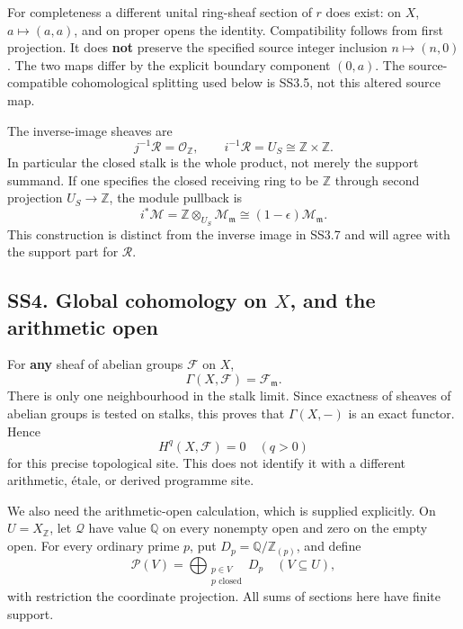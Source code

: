 For completeness a different unital ring-sheaf section of \(r\) does
exist: on \(X\), \(a\mapsto(a,a)\), and on proper opens the identity.
Compatibility follows from first projection. It does \textbf{not}
preserve the specified source integer inclusion \(n\mapsto(n,0)\). The
two maps differ by the explicit boundary component \((0,a)\). The
source-compatible cohomological splitting used below is SS3.5, not this
altered source map.

The inverse-image sheaves are \[
 j^{-1}\mathcal R=\mathcal O_{\mathbb Z},\qquad
 i^{-1}\mathcal R=U_S\cong\mathbb Z\times\mathbb Z.
\tag{SS3.7}
\] In particular the closed stalk is the whole product, not merely the
support summand. If one specifies the closed receiving ring to be
\(\mathbb Z\) through second projection \(U_S\to\mathbb Z\), the module
pullback is \[
 i^*\mathcal M=\mathbb Z\otimes_{U_S}\mathcal M_{\mathfrak m}
 \cong(1-\epsilon)\mathcal M_{\mathfrak m}.
\tag{SS3.8}
\] This construction is distinct from the inverse image in SS3.7 and
will agree with the support part for \(\mathcal R\).

\subsection{\texorpdfstring{SS4. Global cohomology on \(X\), and the
arithmetic
open}{SS4. Global cohomology on X, and the arithmetic open}}\label{ss4.-global-cohomology-on-x-and-the-arithmetic-open}

For \textbf{any} sheaf of abelian groups \(\mathcal F\) on \(X\), \[
 \Gamma(X,\mathcal F)=\mathcal F_{\mathfrak m}.
\tag{SS4.1}
\] There is only one neighbourhood in the stalk limit. Since exactness
of sheaves of abelian groups is tested on stalks, this proves that
\(\Gamma(X,-)\) is an exact functor. Hence \[
 H^q(X,\mathcal F)=0\quad(q>0)
\tag{SS4.2}
\] for this precise topological site. This does not identify it with a
different arithmetic, étale, or derived programme site.

We also need the arithmetic-open calculation, which is supplied
explicitly. On \(U=X_{\mathbb Z}\), let \(\mathcal Q\) have value
\(\mathbb Q\) on every nonempty open and zero on the empty open. For
every ordinary prime \(p\), put \(D_p=\mathbb Q/\mathbb Z_{(p)}\), and
define \[
 \mathcal P(V)=\bigoplus_{\substack{p\in V\\p\text{ closed}}}D_p
\quad(V\subseteq U),
\tag{SS4.3}
\] with restriction the coordinate projection. All sums of sections here
have finite support.

